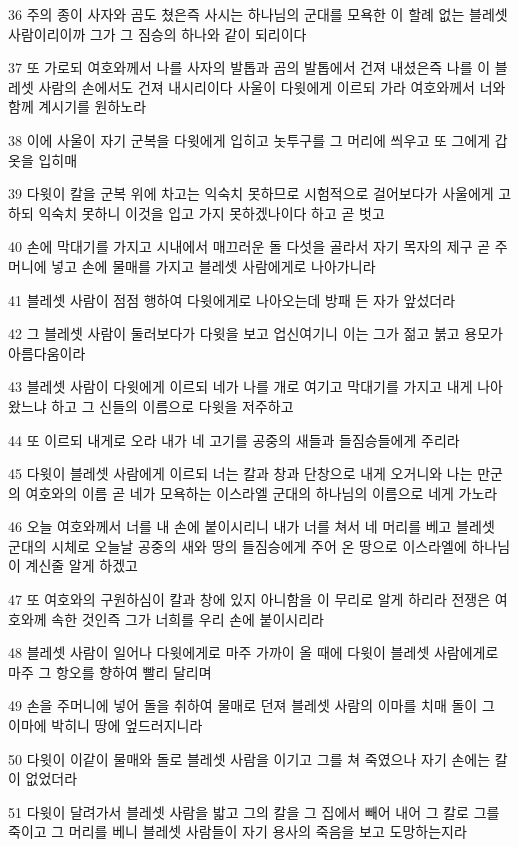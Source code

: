 \par 36 주의 종이 사자와 곰도 쳤은즉 사시는 하나님의 군대를 모욕한 이 할례 없는 블레셋 사람이리이까 그가 그 짐승의 하나와 같이 되리이다
\par 37 또 가로되 여호와께서 나를 사자의 발톱과 곰의 발톱에서 건져 내셨은즉 나를 이 블레셋 사람의 손에서도 건져 내시리이다 사울이 다윗에게 이르되 가라 여호와께서 너와 함께 계시기를 원하노라
\par 38 이에 사울이 자기 군복을 다윗에게 입히고 놋투구를 그 머리에 씌우고 또 그에게 갑옷을 입히매
\par 39 다윗이 칼을 군복 위에 차고는 익숙치 못하므로 시험적으로 걸어보다가 사울에게 고하되 익숙치 못하니 이것을 입고 가지 못하겠나이다 하고 곧 벗고
\par 40 손에 막대기를 가지고 시내에서 매끄러운 돌 다섯을 골라서 자기 목자의 제구 곧 주머니에 넣고 손에 물매를 가지고 블레셋 사람에게로 나아가니라
\par 41 블레셋 사람이 점점 행하여 다윗에게로 나아오는데 방패 든 자가 앞섰더라
\par 42 그 블레셋 사람이 둘러보다가 다윗을 보고 업신여기니 이는 그가 젊고 붉고 용모가 아름다움이라
\par 43 블레셋 사람이 다윗에게 이르되 네가 나를 개로 여기고 막대기를 가지고 내게 나아왔느냐 하고 그 신들의 이름으로 다윗을 저주하고
\par 44 또 이르되 내게로 오라 내가 네 고기를 공중의 새들과 들짐승들에게 주리라
\par 45 다윗이 블레셋 사람에게 이르되 너는 칼과 창과 단창으로 내게 오거니와 나는 만군의 여호와의 이름 곧 네가 모욕하는 이스라엘 군대의 하나님의 이름으로 네게 가노라
\par 46 오늘 여호와께서 너를 내 손에 붙이시리니 내가 너를 쳐서 네 머리를 베고 블레셋 군대의 시체로 오늘날 공중의 새와 땅의 들짐승에게 주어 온 땅으로 이스라엘에 하나님이 계신줄 알게 하겠고
\par 47 또 여호와의 구원하심이 칼과 창에 있지 아니함을 이 무리로 알게 하리라 전쟁은 여호와께 속한 것인즉 그가 너희를 우리 손에 붙이시리라
\par 48 블레셋 사람이 일어나 다윗에게로 마주 가까이 올 때에 다윗이 블레셋 사람에게로 마주 그 항오를 향하여 빨리 달리며
\par 49 손을 주머니에 넣어 돌을 취하여 물매로 던져 블레셋 사람의 이마를 치매 돌이 그 이마에 박히니 땅에 엎드러지니라
\par 50 다윗이 이같이 물매와 돌로 블레셋 사람을 이기고 그를 쳐 죽였으나 자기 손에는 칼이 없었더라
\par 51 다윗이 달려가서 블레셋 사람을 밟고 그의 칼을 그 집에서 빼어 내어 그 칼로 그를 죽이고 그 머리를 베니 블레셋 사람들이 자기 용사의 죽음을 보고 도망하는지라
